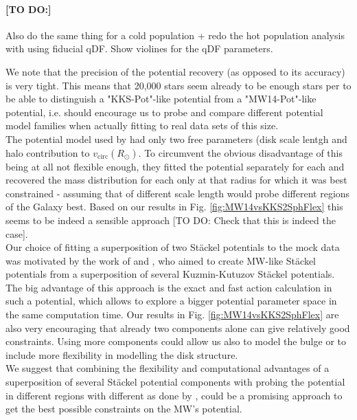 \paragraph{[TO DO:]} Also do the same thing for a cold population + redo the hot population analysis with using fiducial qDF. Show violines for the qDF parameters.





We note that the precision of the potential recovery (as opposed to its accuracy) is very tight. This means that 20,000 stars seem already to be enough stars per \MAP to be able to distinguish a "KKS-Pot"-like potential from a "MW14-Pot"-like potential, i.e. should encourage us to probe and compare different potential model families when actually fitting to real data sets of this size.
\\The potential model used by \citet{bov13} had only two free parameters (disk scale lentgh and halo contribution to $v_\text{circ}(R_\odot)$. To circumvent the obvious disadvantage of this being at all not flexible enough, they fitted the potential separately for each \MAP and recovered the mass distribution for each \MAP only at that radius for which it was best constrained - assuming that \MAPs of different scale length would probe different regions of the Galaxy best. Based on our results in Fig. \ref{fig:MW14vsKKS2SphFlex} this seems to be indeed a sensible approach [TO DO: Check that this is indeed the case].
\\Our choice of fitting a superposition of two St\"{a}ckel potentials to the mock data was motivated by the work of \citet{bat94} and \citet{fam03}, who aimed to create MW-like St\"{a}ckel potentials from a superposition of several Kuzmin-Kutuzov St\"{a}ckel potentials. The big advantage of this approach is the exact and fast action calculation in such a potential, which allows to explore a bigger potential parameter space in the same computation time. Our results in Fig. \ref{fig:MW14vsKKS2SphFlex} are also very encouraging that already two components alone can give relatively good constraints. Using more components could allow us also to model the bulge or to include more flexibility in modelling the disk structure.
\\We suggest that combining the flexibility and computational advantages of a superposition of several St\"{a}ckel potential components with probing the potential in different regions with different \MAPs as done by \citet{bov13}, could be a promising approach to get the best possible constraints on the MW's potential.



